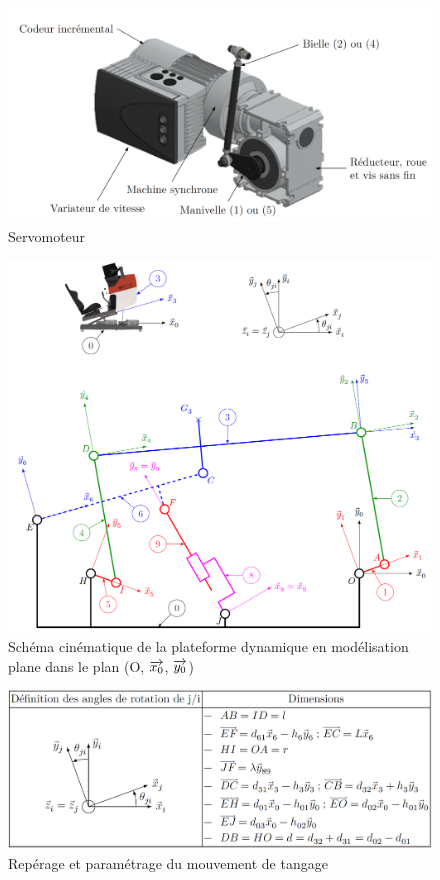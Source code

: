 \begin{figure}[!h]
 \centering\includegraphics[width=0.7\linewidth]{img/figure_B}
 \caption{Servomoteur}
 \label{imgB}
\end{figure}

\newpage

\begin{figure}[!h]
 \centering\includegraphics[width=0.9\linewidth]{img/figure_C}
 \caption{Schéma cinématique de la plateforme dynamique en modélisation plane dans le plan (O, $\protect\overrightarrow{x_0}$, $\protect\overrightarrow{y_0}$)}
 \label{imgC}
\end{figure}

\begin{figure}[!h]
 \centering\includegraphics[width=0.7\linewidth]{img/figure_D}
 \caption{Repérage et paramétrage du mouvement de tangage}
 \label{imgD}
\end{figure}

